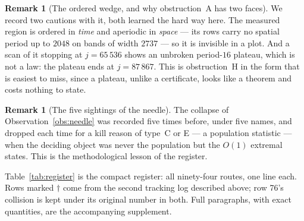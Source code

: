 \documentclass[11pt]{article}
\theoremstyle{definition}
\newtheorem{remark}[theorem]{Remark}
\begin{document}
\begin{remark}[The ordered wedge, and why obstruction~A has two faces]
We record two cautions with it, both learned the hard way here. The measured
region is ordered in \emph{time} and aperiodic in \emph{space} --- its rows
carry no spatial period up to $2048$ on bands of width $2737$ --- so it is
invisible in a plot. And a scan of it stopping at $j=65\,536$ shows an unbroken
period-$16$ plateau, which is not a law: the plateau ends at $j=87\,867$. This
is obstruction~H in the form that is easiest to miss, since a plateau, unlike a
certificate, looks like a theorem and costs nothing to state.
\end{remark}

\begin{remark}[The five sightings of the needle]
The collapse of Observation~\ref{obs:needle} was recorded five times before,
under five names, and dropped each time for a kill reason of type~C or E --- a
population statistic --- when the deciding object was never the population but the
$O(1)$ extremal states. This is the methodological lesson of the register.
\end{remark}

Table~\ref{tab:register} is the compact register: all ninety-four routes, one
line each. Rows marked $\dagger$ come from the second tracking log described
above; row 76's collision is kept under its original number in both. Full paragraphs, with exact
quantities, are the accompanying supplement.
\end{document}

